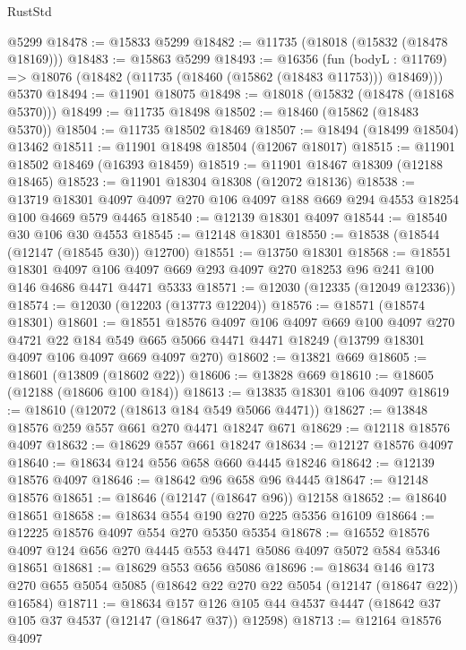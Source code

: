 \begin{lexlean}{RustStd}
\begin{coremodule}
    @5299
@18478 := @15833 @5299
@18482 := @11735 (@18018 (@15832 (@18478 @18169)))
@18483 := @15863 @5299
@18493 := @16356
    (fun (bodyL : @11769) => @18076 (@18482 (@11735 (@18460 (@15862 (@18483 @11753))) @18469)))
    @5370
@18494 := @11901 @18075
@18498 := @18018 (@15832 (@18478 (@18168 @5370)))
@18499 := @11735 @18498
@18502 := @18460 (@15862 (@18483 @5370))
@18504 := @11735 @18502 @18469
@18507 := @18494 (@18499 @18504) @13462
@18511 := @11901 @18498 @18504 (@12067 @18017)
@18515 := @11901 @18502 @18469 (@16393 @18459)
@18519 := @11901 @18467 @18309 (@12188 @18465)
@18523 := @11901 @18304 @18308 (@12072 @18136)
@18538 := @13719
    @18301
    @4097
    @4097
    @270
    @106
    @4097
    @188
    @669
    @294
    @4553
    @18254
    @100
    @4669
    @579
    @4465
@18540 := @12139 @18301 @4097
@18544 := @18540 @30 @106 @30 @4553
@18545 := @12148 @18301
@18550 := @18538 (@18544 (@12147 (@18545 @30)) @12700)
@18551 := @13750 @18301
@18568 := @18551
    @18301
    @4097
    @106
    @4097
    @669
    @293
    @4097
    @270
    @18253
    @96
    @241
    @100
    @146
    @4686
    @4471
    @4471
    @5333
@18571 := @12030 (@12335 (@12049 @12336))
@18574 := @12030 (@12203 (@13773 @12204))
@18576 := @18571 (@18574 @18301)
@18601 := @18551
    @18576
    @4097
    @106
    @4097
    @669
    @100
    @4097
    @270
    @4721
    @22
    @184
    @549
    @665
    @5066
    @4471
    @4471
    @18249
    (@13799 @18301 @4097 @106 @4097 @669 @4097 @270)
@18602 := @13821 @669
@18605 := @18601 (@13809 (@18602 @22))
@18606 := @13828 @669
@18610 := @18605 (@12188 (@18606 @100 @184))
@18613 := @13835 @18301 @106 @4097
@18619 := @18610 (@12072 (@18613 @184 @549 @5066 @4471))
@18627 := @13848 @18576 @259 @557 @661 @270 @4471 @18247 @671
@18629 := @12118 @18576 @4097
@18632 := @18629 @557 @661 @18247
@18634 := @12127 @18576 @4097
@18640 := @18634 @124 @556 @658 @660 @4445 @18246
@18642 := @12139 @18576 @4097
@18646 := @18642 @96 @658 @96 @4445
@18647 := @12148 @18576
@18651 := @18646 (@12147 (@18647 @96)) @12158
@18652 := @18640 @18651
@18658 := @18634 @554 @190 @270 @225 @5356 @16109
@18664 := @12225 @18576 @4097 @554 @270 @5350 @5354
@18678 := @16552 @18576 @4097 @124 @656 @270 @4445 @553 @4471 @5086 @4097 @5072 @584 @5346 @18651
@18681 := @18629 @553 @656 @5086
@18696 := @18634
    @146
    @173
    @270
    @655
    @5054
    @5085
    (@18642 @22 @270 @22 @5054 (@12147 (@18647 @22)) @16584)
@18711 := @18634
    @157
    @126
    @105
    @44
    @4537
    @4447
    (@18642 @37 @105 @37 @4537 (@12147 (@18647 @37)) @12598)
@18713 := @12164 @18576 @4097

\end{coremodule}
\end{lexlean}
